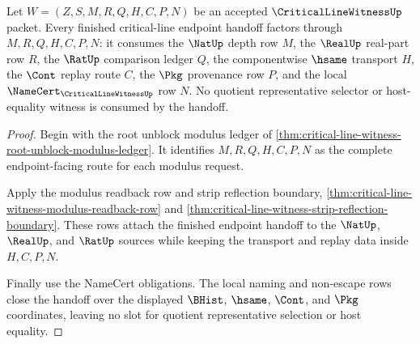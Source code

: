 \begin{theorem}
\label{thm:critical-line-witness-finished-endpoint-handoff}
Let $W=(Z,S,M,R,Q,H,C,P,N)$ be an accepted $\CriticalLineWitnessUp$ packet. Every finished critical-line endpoint handoff factors through $M,R,Q,H,C,P,N$: it consumes the $\NatUp$ depth row $M$, the $\RealUp$ real-part row $R$, the $\RatUp$ comparison ledger $Q$, the componentwise $\hsame$ transport $H$, the $\Cont$ replay route $C$, the $\Pkg$ provenance row $P$, and the local $\NameCert_{\CriticalLineWitnessUp}$ row $N$. No quotient representative selector or host-equality witness is consumed by the handoff.
\end{theorem}
\begin{proof}
Begin with the root unblock modulus ledger of \autoref{thm:critical-line-witness-root-unblock-modulus-ledger}. It identifies $M,R,Q,H,C,P,N$ as the complete endpoint-facing route for each modulus request.

Apply the modulus readback row and strip reflection boundary, \autoref{thm:critical-line-witness-modulus-readback-row} and \autoref{thm:critical-line-witness-strip-reflection-boundary}. These rows attach the finished endpoint handoff to the $\NatUp$, $\RealUp$, and $\RatUp$ sources while keeping the transport and replay data inside $H,C,P,N$.

Finally use the NameCert obligations. The local naming and non-escape rows close the handoff over the displayed $\BHist$, $\hsame$, $\Cont$, and $\Pkg$ coordinates, leaving no slot for quotient representative selection or host equality.
\end{proof}

